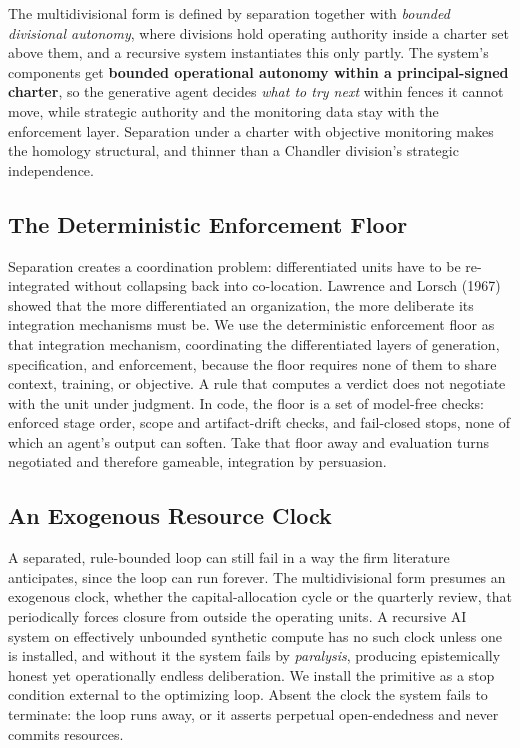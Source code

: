 \documentclass[11pt]{article}
\begin{document}
The multidivisional form is defined by separation together with \emph{bounded divisional autonomy}, where divisions hold operating authority inside a charter set above them, and a recursive system instantiates this only partly. The system's components get \textbf{bounded operational autonomy within a principal-signed charter}, so the generative agent decides \emph{what to try next} within fences it cannot move, while strategic authority and the monitoring data stay with the enforcement layer. Separation under a charter with objective monitoring makes the homology structural, and thinner than a Chandler division's strategic independence.

\subsection{The Deterministic Enforcement Floor}

Separation creates a coordination problem: differentiated units have to be re-integrated without collapsing back into co-location. Lawrence and Lorsch (1967) showed that the more differentiated an organization, the more deliberate its integration mechanisms must be. We use the deterministic enforcement floor as that integration mechanism, coordinating the differentiated layers of generation, specification, and enforcement, because the floor requires none of them to share context, training, or objective. A rule that computes a verdict does not negotiate with the unit under judgment. In code, the floor is a set of model-free checks: enforced stage order, scope and artifact-drift checks, and fail-closed stops, none of which an agent's output can soften. Take that floor away and evaluation turns negotiated and therefore gameable, integration by persuasion.

\subsection{An Exogenous Resource Clock}

A separated, rule-bounded loop can still fail in a way the firm literature anticipates, since the loop can run forever. The multidivisional form presumes an exogenous clock, whether the capital-allocation cycle or the quarterly review, that periodically forces closure from outside the operating units. A recursive AI system on effectively unbounded synthetic compute has no such clock unless one is installed, and without it the system fails by \emph{paralysis}, producing epistemically honest yet operationally endless deliberation. We install the primitive as a stop condition external to the optimizing loop. Absent the clock the system fails to terminate: the loop runs away, or it asserts perpetual open-endedness and never commits resources.
\end{document}
